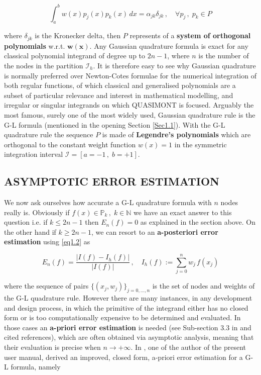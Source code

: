\documentclass[a4paper, twosided]{book}
\begin{document}
\begin{equation}\label{eq1.6}
    \int_a^b w(x)p_j(x)p_k(x)\,dx = \alpha_{jk}\delta_{jk}\,,\quad\forall p_j\,,\;p_k\in P
\end{equation}

\noindent
where $\delta_{jk}$ is the Kronecker delta, then $P$ represents of a \color{poliDarkBlue} \textbf{system of orthogonal polynomials} \color{black} w.r.t. \color{poliDarkBlue} $\boldsymbol{w(x)}$\color{black}. Any Gaussian quadrature formula is exact for any classical polynomial integrand of degree up to $2n-1$, where $n$ is the number of the nodes in the partition $\mathcal{I}_h$. It is therefore easy to see why Gaussian quadrature is normally preferred over Newton-Cotes formulae for the numerical integration of both regular functions, of which classical and generalised polynomials are a subset of particular relevance and interest in mathematical modelling, and irregular or singular integrands on which QUASIMONT is focused. Arguably the most famous, surely one of the most widely used, Gaussian quadrature rule is the G-L formula (mentioned in the opening Section \ref{Sec1.1}). With the G-L quadrature rule the sequence $P$ is made of \color{poliDarkBlue} \textbf{Legendre's polynomials} \color{black} which are orthogonal to the constant weight function $w(x)=1$ in the symmetric integration interval $\mathcal{I}= [a=-1\,,\;b=+1]$.

\subsection[Asymptotic error estimation]{\changefont ASYMPTOTIC ERROR ESTIMATION}\label{SubSec1.2.3}

We now ask ourselves how accurate a G-L quadrature formula with $n$ nodes really is. Obviously if $f(x)\in\mathbb{P}_k\,,\;k\in\mathbb{N}$ we have an exact answer to this question i.e. if $k\leq2n-1$ then $E_n(f)=0$ as explained in the section above. On the other hand if $k\geq2n-1$, we can resort to an \color{poliDarkBlue} \textbf{a-posteriori error estimation} \color{black} using \ref{eq1.2} as

\begin{equation}\label{eq1.7}
    E_n(f) = \frac{|I(f)-I_h(f)|}{|I(f)|}\,,\quad I_h(f):=\sum_{j=0}^{n}w_j\,f(x_j)
\end{equation}

\noindent
where the sequence of pairs $\{(x_j,w_j)\}_{j=0,...,n}$ is the set of nodes and weights of the G-L quadrature rule. However there are many instances, in any development and design process, in which the primitive of the integrand either has no closed form or is too computationally expensive to be determined and evaluated. In those cases an \color{poliDarkBlue} \textbf{a-priori error estimation} \color{black} is needed (see Sub-section 3.3 in \cite{Lombardi21} and cited references), which are often obtained via asymptotic analysis, meaning that their evaluation is precise when $n\to+\infty$. In \cite{Lombardi09}, one of the author of the present user manual, derived an improved, closed form, a-priori error estimation for a G-L formula, namely
\end{document}
